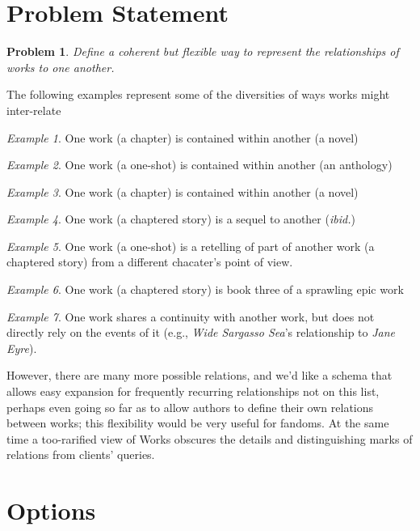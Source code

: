 \documentclass{amsart}
\newtheorem*{prob}{Problem}
\theoremstyle{remark}
\newtheorem{eg}{Example}
\begin{document}
    \section{Problem Statement}
    \begin{prob}
        Define a coherent but flexible way to represent the relationships of works to one another.
    \end{prob}
    The following examples represent some of the diversities of ways works might inter-relate
    \begin{eg}
        One work (a chapter) is contained within another (a novel)
    \end{eg}
    \begin{eg}
        One work (a one-shot) is contained within another (an anthology)
    \end{eg}
    \begin{eg}
        One work (a chapter) is contained within another (a novel)
    \end{eg}
    \begin{eg}
        One work (a chaptered story) is a sequel to another (\textit{ibid.})
    \end{eg}
    \begin{eg}
        One work (a one-shot) is a retelling of part of another work (a chaptered story) from a different chacater's point of view.
    \end{eg}
    \begin{eg}
        One work (a chaptered story) is book three of a sprawling epic work
    \end{eg}
    \begin{eg}
        One work shares a continuity with another work, but does not directly rely on the events of it (e.g., \textit{Wide Sargasso Sea}'s relationship to \textit{Jane Eyre}).
    \end{eg}
    However, there are many more possible relations, and we'd like a schema that allows easy expansion for frequently recurring relationships not on this list, perhaps even going so far as to allow authors to define their own relations between works; this flexibility would be very useful for fandoms. At the same time a too-rarified view of Works obscures the details and distinguishing marks of relations from clients' queries. 
    \section{Options}
\end{document}
